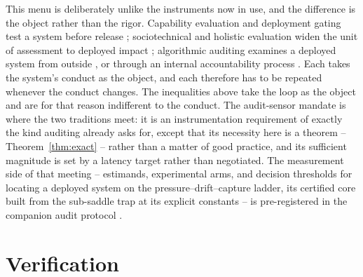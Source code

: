 \documentclass[11pt]{article}
\theoremstyle{definition}
\theoremstyle{remark}
\numberwithin{equation}{section}
\begin{document}
This menu is deliberately unlike the instruments now in use, and the difference is the object rather than the rigor. Capability evaluation and deployment gating test a system before release \citep{shevlane2023model}; sociotechnical and holistic evaluation widen the unit of assessment to deployed impact \citep{weidinger2023sociotechnical, solaiman2025evaluating}; algorithmic auditing examines a deployed system from outside \citep{metaxa2021auditing}, or through an internal accountability process \citep{raji2020closing}. Each takes the system's conduct as the object, and each therefore has to be repeated whenever the conduct changes. The inequalities above take the loop as the object and are for that reason indifferent to the conduct. The audit-sensor mandate is where the two traditions meet: it is an instrumentation requirement of exactly the kind auditing already asks for, except that its necessity here is a theorem -- Theorem~\ref{thm:exact} -- rather than a matter of good practice, and its sufficient magnitude is set by a latency target rather than negotiated. The measurement side of that meeting -- estimands, experimental arms, and decision thresholds for locating a deployed system on the pressure--drift--capture ladder, its certified core built from the sub-saddle trap at its explicit constants -- is pre-registered in the companion audit protocol \citep{hofheinz2026audit}.

\section{Verification}\label{sec:verification}
\end{document}
